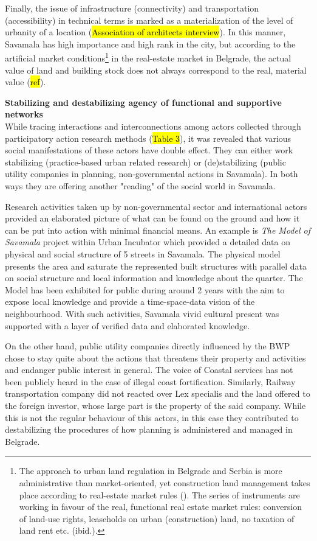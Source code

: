\documentclass[11pt]{report}
\begin{document}
Finally, the issue of infrastructure (connectivity) and transportation (accessibility) in technical terms is marked as a materialization of the level of urbanity of a location (\hl{Association of architects interview}). 
In this manner, Savamala has high importance and high rank in the city, but according to the artificial market conditions\footnote{
The approach to urban land regulation in Belgrade and Serbia is more administrative than market-oriented, yet construction land management takes place according to real-estate market rules (\cite{Zekovic and Maricic, 2017 land market}). The series of instruments are working in favour of the real, functional real estate market rules: conversion of land-use rights, leaseholds on urban (construction) land, no taxation of land rent etc. (ibid.).}
in the real-estate market in Belgrade, the actual value of land and building stock does not always correspond to the real, material value (\hl{ref}).

\textbf{Stabilizing and destabilizing agency of functional and supportive networks}
\\
While tracing interactions and interconnections among actors collected through participatory action research methods (\hl{Table 3}), it was revealed that various social manifestations of these actors have double effect. They can either work stabilizing (practice-based urban related research) or (de)stabilizing (public utility companies in planning, non-governmental actions in Savamala).
In both ways they are offering another "reading" of the social world in Savamala.

Research activities taken up by non-governmental sector and international actors provided an elaborated picture of what can be found on the ground and how it can be put into action with minimal financial means.
An example is \textit{The Model of Savamala} project within Urban Incubator which provided a detailed data on physical and social structure of 5 streets in Savamala.
The physical model presents the area and saturate the represented built structures with parallel data on social structure and local information and knowledge about the quarter. The Model has been exhibited for public during around 2 years with the aim to expose local knowledge and provide a time-space-data vision of the neighbourhood. 
With such activities, Savamala vivid cultural present was supported with a layer of verified data and elaborated knowledge.

On the other hand, public utility companies directly influenced by the BWP chose to stay quite about the actions that threatens their property and activities and endanger public interest in general. The voice of Coastal services has not been publicly heard in the case of illegal coast fortification. Similarly, Railway transportation company did not reacted over Lex specialis and the land offered to the foreign investor, whose large part is the property of the said company.  While this is not the regular behaviour of this actors, in this case they contributed to destabilizing the procedures of how planning is administered and managed in Belgrade.
\end{document}
